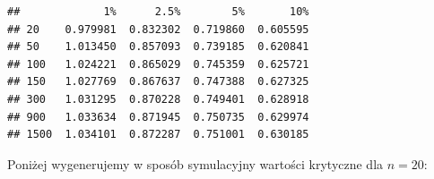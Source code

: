 \documentclass[polish,]{book}
\newenvironment{Shaded}{\begin{snugshade}}{\end{snugshade}}
\newcommand{\BuiltInTok}[1]{#1}
\newcommand{\ControlFlowTok}[1]{\textcolor[rgb]{0.13,0.29,0.53}{\textbf{#1}}}
\newcommand{\DecValTok}[1]{\textcolor[rgb]{0.00,0.00,0.81}{#1}}
\newcommand{\FloatTok}[1]{\textcolor[rgb]{0.00,0.00,0.81}{#1}}
\newcommand{\KeywordTok}[1]{\textcolor[rgb]{0.13,0.29,0.53}{\textbf{#1}}}
\newcommand{\NormalTok}[1]{#1}
\newcommand{\OperatorTok}[1]{\textcolor[rgb]{0.81,0.36,0.00}{\textbf{#1}}}
\newcommand{\StringTok}[1]{\textcolor[rgb]{0.31,0.60,0.02}{#1}}
\begin{document}
\begin{Shaded}
\end{Shaded}

\begin{verbatim}
##             1%      2.5%        5%       10%
## 20    0.979981  0.832302  0.719860  0.605595
## 50    1.013450  0.857093  0.739185  0.620841
## 100   1.024221  0.865029  0.745359  0.625721
## 150   1.027769  0.867637  0.747388  0.627325
## 300   1.031295  0.870228  0.749401  0.628918
## 900   1.033634  0.871945  0.750735  0.629974
## 1500  1.034101  0.872287  0.751001  0.630185
\end{verbatim}

Poniżej wygenerujemy w sposób symulacyjny wartości krytyczne dla \(n=20\):
\end{document}
